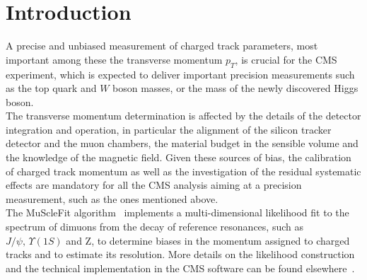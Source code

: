 \section{Introduction}
A precise and unbiased measurement of charged track parameters, most important among these
the transverse momentum $p_{T}$, is crucial for the CMS experiment, which is expected to deliver
important precision measurements such as the top quark and $W$ boson masses, or the mass of
the newly discovered Higgs boson. \\
The transverse momentum determination is affected by the details of the detector integration and
operation, in particular the alignment of the silicon tracker detector and the muon chambers, 
the material budget in the sensible volume and the knowledge of the magnetic field. 
Given these sources of bias, the calibration of charged track momentum as well as the
investigation of the residual systematic effects are mandatory for all the CMS analysis aiming
at a precision measurement, such as the ones mentioned above.\\
The MuScleFit algorithm~\cite{CMS_AN_2010-059} implements a multi-dimensional likelihood fit to 
the spectrum of dimuons from the decay of
reference resonances, such as $J/\psi,\, \Upsilon(1S)$ and Z, to determine biases in the momentum assigned to
charged tracks and to estimate its resolution. More details on the likelihood construction and 
the technical implementation in the CMS software can be found elsewhere~\cite{CMS_AN_2010-059}.\\

